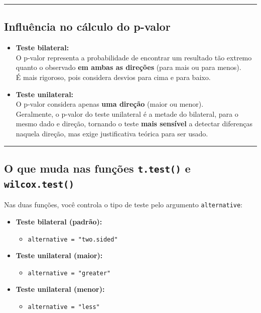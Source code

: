 \documentclass[
]{book}
\providecommand{\tightlist}{%
  \setlength{\itemsep}{0pt}\setlength{\parskip}{0pt}}
\begin{document}
\begin{center}\rule{0.5\linewidth}{0.5pt}\end{center}

\subsection{Influência no cálculo do p-valor}\label{influuxeancia-no-cuxe1lculo-do-p-valor}

\begin{itemize}
\item
  \textbf{Teste bilateral:}\\
  O p-valor representa a probabilidade de encontrar um resultado tão extremo quanto o observado \textbf{em ambas as direções} (para mais ou para menos).\\
  É mais rigoroso, pois considera desvios para cima e para baixo.
\item
  \textbf{Teste unilateral:}\\
  O p-valor considera apenas \textbf{uma direção} (maior ou menor).\\
  Geralmente, o p-valor do teste unilateral é a metade do bilateral, para o mesmo dado e direção, tornando o teste \textbf{mais sensível} a detectar diferenças naquela direção, mas exige justificativa teórica para ser usado.
\end{itemize}

\begin{center}\rule{0.5\linewidth}{0.5pt}\end{center}

\subsection{\texorpdfstring{O que muda nas funções \texttt{t.test()} e \texttt{wilcox.test()}}{O que muda nas funções t.test() e wilcox.test()}}\label{o-que-muda-nas-funuxe7uxf5es-t.test-e-wilcox.test}

Nas duas funções, você controla o tipo de teste pelo argumento \texttt{alternative}:

\begin{itemize}
\tightlist
\item
  \textbf{Teste bilateral (padrão):}

  \begin{itemize}
  \tightlist
  \item
    \texttt{alternative\ =\ "two.sided"}
  \end{itemize}
\item
  \textbf{Teste unilateral (maior):}

  \begin{itemize}
  \tightlist
  \item
    \texttt{alternative\ =\ "greater"}
  \end{itemize}
\item
  \textbf{Teste unilateral (menor):}

  \begin{itemize}
  \tightlist
  \item
    \texttt{alternative\ =\ "less"}
  \end{itemize}
\end{itemize}
\end{document}
